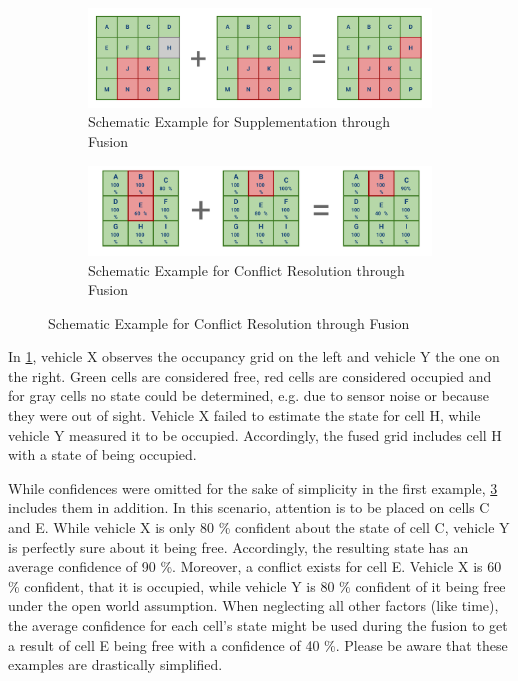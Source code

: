 \begin{figure}[h]
	\centering
	\begin{subfigure}[b]{1\textwidth}
		\includegraphics[width=0.9\linewidth]{98_images/fusion_goals_ex1}
		\caption{Schematic Example for Supplementation through Fusion}
		\label{fig:fusion_goals_1}
	\end{subfigure}
	
	\begin{subfigure}[b]{1\textwidth}
		\includegraphics[width=0.89\linewidth]{98_images/fusion_goals_ex2}
		\caption{Schematic Example for Conflict Resolution through Fusion}
		\label{fig:fusion_goals_2}
	\end{subfigure}
\end{figure}

In \cref{fig:fusion_goals_1}, vehicle X observes the occupancy grid on the left and vehicle Y the one on the right. Green cells are considered free, red cells are considered occupied and for gray cells no state could be determined, e.g. due to sensor noise or because they were out of sight. Vehicle X failed to estimate the state for cell H, while vehicle Y measured it to be occupied. Accordingly, the fused grid includes cell H with a state of being occupied.

While confidences were omitted for the sake of simplicity in the first example, \cref{fig:fusion_goals_2} includes them in addition. In this scenario, attention is to be placed on cells C and E. While vehicle X is only 80 \% confident about the state of cell C, vehicle Y is perfectly sure about it being free. Accordingly, the resulting state has an average confidence of 90 \%. Moreover, a conflict exists for cell E. Vehicle X is 60 \% confident, that it is occupied, while vehicle Y is 80 \% confident of it being free under the open world assumption. When neglecting all other factors (like time), the average confidence for each cell's state might be used during the fusion to get a result of cell E being free with a confidence of 40 \%. Please be aware that these examples are drastically simplified.

